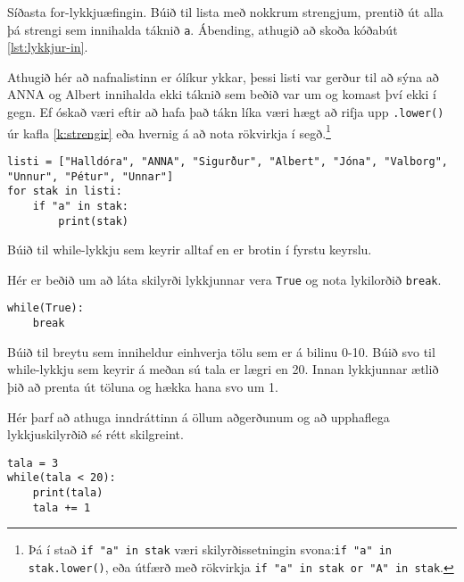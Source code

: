 \begin{exercise}\label{lyk5}
Síðasta for-lykkjuæfingin.
Búið til lista með nokkrum strengjum, prentið út alla þá strengi sem innihalda táknið \texttt{a}.
Ábending, athugið að skoða kóðabút \ref{lst:lykkjur-in}.
\end{exercise}
\begin{Answer}[ref={lyk5}]
Athugið hér að nafnalistinn er ólíkur ykkar, þessi listi var gerður til að sýna að ANNA og Albert innihalda ekki táknið sem beðið var um og komast því ekki í gegn.
Ef óskað væri eftir að hafa það tákn líka væri hægt að rifja upp \texttt{.lower()} úr kafla \ref{k:strengir} eða hvernig á að nota rökvirkja í segð.\footnote{Þá í stað \texttt{if "a" in stak} væri skilyrðissetningin svona:\texttt{if "a" in stak.lower()}, eða útfærð með rökvirkja \texttt{if "a" in stak or "A" in stak}.}
	
\begin{lstlisting}
listi = ["Halldóra", "ANNA", "Sigurður", "Albert", "Jóna", "Valborg", "Unnur", "Pétur", "Unnar"]
for stak in listi:
	if "a" in stak:
		print(stak)\end{lstlisting}
\end{Answer}

\begin{exercise}\label{lyk6}
Búið til while-lykkju sem keyrir alltaf en er brotin í fyrstu keyrslu.
\end{exercise}
\begin{Answer}[ref={lyk6}]
Hér er beðið um að láta skilyrði lykkjunnar vera \texttt{True} og nota lykilorðið \texttt{break}.
	
\begin{lstlisting}
while(True):
	break\end{lstlisting}
\end{Answer}

\begin{exercise}\label{lyk7}
Búið til breytu sem inniheldur einhverja tölu sem er á bilinu 0-10.
Búið svo til while-lykkju sem keyrir á meðan sú tala er lægri en 20.
Innan lykkjunnar ætlið þið að prenta út töluna og hækka hana svo um 1.
\end{exercise}
\begin{Answer}[ref={lyk7}]
Hér þarf að athuga inndráttinn á öllum aðgerðunum og að upphaflega lykkjuskilyrðið sé rétt skilgreint.
\begin{lstlisting}
tala = 3
while(tala < 20):
	print(tala)
	tala += 1\end{lstlisting}
\end{Answer}

